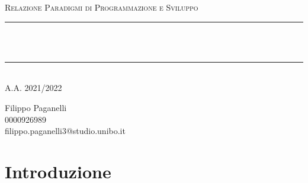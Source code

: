\documentclass[12pt]{article}
\begin{document}

\begin{titlepage}

\newcommand{\HRule}{\rule{\linewidth}{0.5mm}}

\center

\textsc{\Large Relazione Paradigmi di Programmazione e Sviluppo}\\[0.5cm]

\HRule \\[0.4cm]
 \\
\HRule \\[0.4cm]
\center A.A. 2021/2022
\vfill

\begin{flushleft}
Filippo Paganelli \\ 0000926989 \\ filippo.paganelli3@studio.unibo.it
\end{flushleft}


\end{titlepage}

\tableofcontents

\newpage
\section{Introduzione}

\newpage
{}
\begin{thebibliography}{4}




\end{thebibliography}
\end{document}

